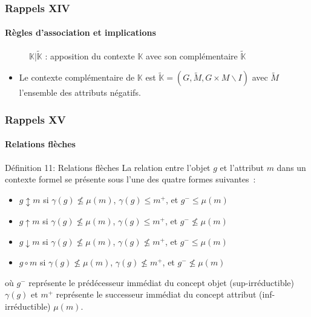 \documentclass[french]{beamer}
\def\KK{\mathbb{K}}
\def\KKn{\tilde{\mathbb{K}}}
\begin{document}
\begin{frame}
\frametitle{Rappels XIV}
\framesubtitle{Règles d'association et implications}
\begin{figure}[h]
\label{cap:fig:negctx}
\begin{center}
\begin{cxt}%
\cxtName{}%
%
%
%
%
%
%
%
%
%
%
%
%
\end{cxt}
\end{center}
\caption{$\mathbb{K}|\tilde{\mathbb{K}}$ : apposition du contexte $\KK$ avec son complémentaire $\KKn$}
\end{figure}
\begin{itemize}
  \item Le contexte complémentaire de $\KK$ est $\KKn = (G, \tilde{M}, G \times M \backslash I)$ avec $\tilde{M}$ l'ensemble des attributs négatifs.
\end{itemize}
\end{frame}

\begin{frame}
\frametitle{Rappels XV}
\framesubtitle{Relations flèches}
\begin{block}{Définition 11: Relations flèches}
La relation entre l'objet $g$ et l'attribut $m$ dans un contexte formel se présente sous l'une des quatre formes suivantes~:
\begin{itemize}
\item $g \updownarrow m$ si $\gamma(g) \not\leq \mu(m)$, $\gamma(g) \leq m^+$, et $g^- \leq \mu(m)$
\item $g \uparrow m$ si $\gamma(g) \not\leq \mu(m)$, $\gamma(g) \leq m^+$, et $g^- \not\leq \mu(m)$
\item $g \downarrow m$ si $\gamma(g) \not\leq \mu(m)$, $\gamma(g) \not\leq m^+$, et $g^- \leq \mu(m)$
\item $g \circ m$ si $\gamma(g) \not\leq \mu(m)$, $\gamma(g) \not\leq m^+$, et $g^- \not\leq \mu(m)$
\end{itemize}
où $g^-$ représente le prédécesseur immédiat du concept objet (sup-irréductible) $\gamma(g)$ 
et $m^+$ représente le successeur immédiat du concept attribut (inf-irréductible) $ \mu(m)$.
\end{block}
\end{frame}
\end{document}
